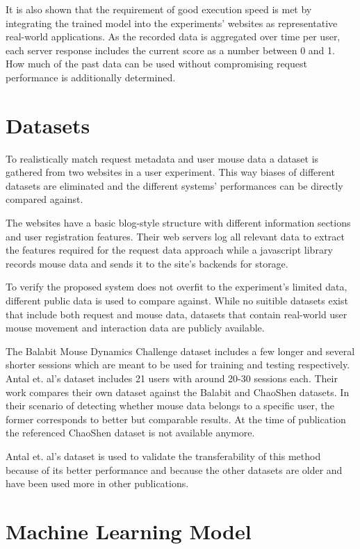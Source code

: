 \documentclass[
    fontsize=12pt,
    headings=small,
    parskip=half,           %
    bibliography=totoc,
    numbers=noenddot,       %
    open=any,               %
    final,                   %
    table
]{scrreprt}
\begin{document}
It is also shown that the requirement of good execution speed is met by integrating the trained model into the experiments' websites as representative real-world applications. As the recorded data is aggregated over time per user, each server response includes the current score as a number between 0 and 1. How much of the past data can be used without compromising request performance is additionally determined.

\section{Datasets}

To realistically match request metadata and user mouse data a dataset is gathered from two websites in a user experiment. This way biases of different datasets are eliminated and the different systems' performances can be directly compared against.

The websites have a basic blog-style structure with different information sections and user registration features. Their web servers log all relevant data to extract the features required for the request data approach while a javascript library records mouse data and sends it to the site's backends for storage.

To verify the proposed system does not overfit to the experiment's limited data, different public data is used to compare against. While no suitible datasets exist that include both request and mouse data, datasets that contain real-world user mouse movement and interaction data are publicly available.

The Balabit Mouse Dynamics Challenge dataset \cite{BALABIT_CHALLENGE} includes a few longer and several shorter sessions which are meant to be used for training and testing respectively.
Antal et. al's dataset \cite{9111596} includes 21 users with around 20-30 sessions each. Their work compares their own dataset against the Balabit and ChaoShen datasets. In their scenario of detecting whether mouse data belongs to a specific user, the former corresponds to better but comparable results.
At the time of publication the referenced ChaoShen dataset is not available anymore.

Antal et. al's dataset is used to validate the transferability of this method because of its better performance and because the other datasets are older and have been used more in other publications.


\section{Machine Learning Model}
\end{document}
